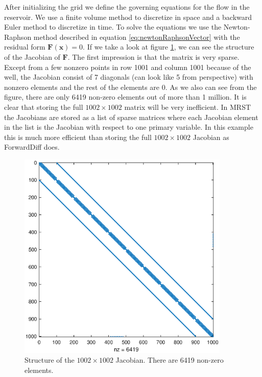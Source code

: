 After initializing the grid we define the governing equations for the flow in the reservoir. We use a finite volume method to discretize in space and a backward Euler method to discretize in time. To solve the equations we use the Newton-Raphson method described in equation \eqref{eq:newtonRaphsonVector} with the residual form $\boldsymbol{F}(\boldsymbol{x}) = 0$. If we take a look at figure \ref{fig:flowSolverJacobian}, we can see the structure of the Jacobian of $\boldsymbol{F}$. The first impression is that the matrix is very sparse. Except from a few nonzero points in row 1001 and column 1001 because of the well, the Jacobian consist of 7 diagonals (can look like 5 from perspective) with nonzero elements and the rest of the elements are 0. As we also can see from the figure, there are only 6419 non-zero elements out of more than 1 million. It is clear that storing the full $1002\times 1002$ matrix will be very inefficient. In MRST the Jacobians are stored as a list of sparse matrices where each Jacobian element in the list is the Jacobian with respect to one primary variable. In this example this is much more efficient than storing the full $1002\times 1002$ Jacobian as ForwardDiff does.

\begin{figure}[htbp]
    \centering
    \includegraphics[width = 0.9\textwidth]{figures/flowSolver_Jacobian.eps}
    \caption{Structure of the $1002\times 1002$ Jacobian. There are 6419 non-zero elements.}
    \label{fig:flowSolverJacobian}
\end{figure}